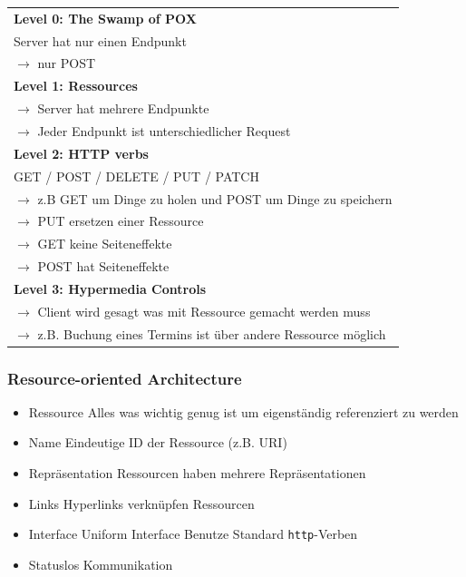 \documentclass[a4paper, landscape, 8pt]{scrartcl}
\begin{document}
\begin{multicols*}{4}
        \begin{tabularx}{\columnwidth}{X}
            \hline
            \textbf{Level 0: The Swamp of POX} \\
            Server hat nur einen Endpunkt \\
            $\to$ nur POST \\
            \hline
            \textbf{Level 1: Ressources} \\
            $\to$ Server hat mehrere Endpunkte \\
            $\to$ Jeder Endpunkt ist unterschiedlicher Request \\
            \hline
            \textbf{Level 2: HTTP verbs} \\
            GET / POST / DELETE / PUT / PATCH \\
            $\to$ z.B GET um Dinge zu holen und POST um Dinge zu speichern \\
            $\to$ PUT ersetzen einer Ressource \\
            $\to$ GET keine Seiteneffekte \\
            $\to$ POST hat Seiteneffekte \\
            \hline
            \textbf{Level 3: Hypermedia Controls} \\
            $\to$ Client wird gesagt was mit Ressource gemacht werden muss \\
            $\to$ z.B. Buchung eines Termins ist über andere Ressource möglich \\
            \hline
        \end{tabularx}

        \subsubsection{Resource-oriented Architecture}
        \begin{itemize}
            \item Ressource
            \subitem Alles was wichtig genug ist um eigenständig referenziert zu werden
            \item Name
            \subitem Eindeutige ID der Ressource (z.B. URI)
            \item Repräsentation
            \subitem Ressourcen haben mehrere Repräsentationen
            \item Links
            \subitem Hyperlinks verknüpfen Ressourcen
            \item Interface
            \subitem Uniform Interface
            \subitem Benutze Standard \texttt{http}-Verben
            \item Statuslos Kommunikation
        \end{itemize}


\end{multicols*}
\end{document}
